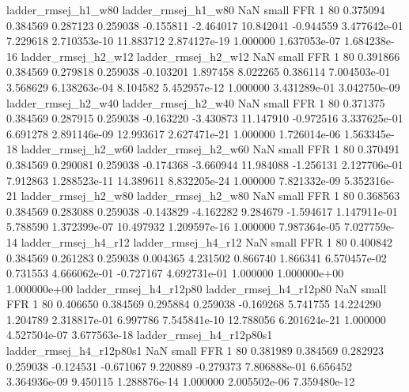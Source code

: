      ladder_rmsej_h1_w80      ladder_rmsej_h1_w80                   NaN      small      FFR                 1 80 0.375094       0.384569 0.287123       0.259038   -0.155811     -2.464017     10.842041    -0.944559   3.477642e-01  7.229618 2.710353e-10    11.883712   2.874127e-19            1.000000    1.637053e-07        1.684238e-16
     ladder_rmsej_h2_w12      ladder_rmsej_h2_w12                   NaN      small      FFR                 1 80 0.391866       0.384569 0.279818       0.259038   -0.103201      1.897458      8.022265     0.386114   7.004503e-01  3.568629 6.138263e-04     8.104582   5.452957e-12            1.000000    3.431289e-01        3.042750e-09
     ladder_rmsej_h2_w40      ladder_rmsej_h2_w40                   NaN      small      FFR                 1 80 0.371375       0.384569 0.287915       0.259038   -0.163220     -3.430873     11.147910    -0.972516   3.337625e-01  6.691278 2.891146e-09    12.993617   2.627471e-21            1.000000    1.726014e-06        1.563345e-18
     ladder_rmsej_h2_w60      ladder_rmsej_h2_w60                   NaN      small      FFR                 1 80 0.370491       0.384569 0.290081       0.259038   -0.174368     -3.660944     11.984088    -1.256131   2.127706e-01  7.912863 1.288523e-11    14.389611   8.832205e-24            1.000000    7.821332e-09        5.352316e-21
     ladder_rmsej_h2_w80      ladder_rmsej_h2_w80                   NaN      small      FFR                 1 80 0.368563       0.384569 0.283088       0.259038   -0.143829     -4.162282      9.284679    -1.594617   1.147911e-01  5.788590 1.372399e-07    10.497932   1.209597e-16            1.000000    7.987364e-05        7.027759e-14
     ladder_rmsej_h4_r12      ladder_rmsej_h4_r12                   NaN      small      FFR                 1 80 0.400842       0.384569 0.261283       0.259038    0.004365      4.231502      0.866740     1.866341   6.570457e-02  0.731553 4.666062e-01    -0.727167   4.692731e-01            1.000000    1.000000e+00        1.000000e+00
  ladder_rmsej_h4_r12p80   ladder_rmsej_h4_r12p80                   NaN      small      FFR                 1 80 0.406650       0.384569 0.295884       0.259038   -0.169268      5.741755     14.224290     1.204789   2.318817e-01  6.997786 7.545841e-10    12.788056   6.201624e-21            1.000000    4.527504e-07        3.677563e-18
ladder_rmsej_h4_r12p80s1 ladder_rmsej_h4_r12p80s1                   NaN      small      FFR                 1 80 0.381989       0.384569 0.282923       0.259038   -0.124531     -0.671067      9.220889    -0.279373   7.806888e-01  6.656452 3.364936e-09     9.450115   1.288876e-14            1.000000    2.005502e-06        7.359480e-12
